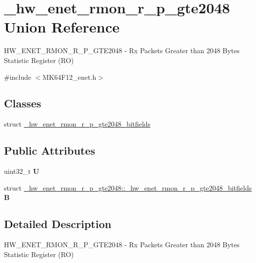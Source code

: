 \hypertarget{union__hw__enet__rmon__r__p__gte2048}{}\section{\+\_\+hw\+\_\+enet\+\_\+rmon\+\_\+r\+\_\+p\+\_\+gte2048 Union Reference}
\label{union__hw__enet__rmon__r__p__gte2048}


H\+W\+\_\+\+E\+N\+E\+T\+\_\+\+R\+M\+O\+N\+\_\+\+R\+\_\+\+P\+\_\+\+G\+T\+E2048 -\/ Rx Packets Greater than 2048 Bytes Statistic Register (RO)  




{\ttfamily \#include $<$M\+K64\+F12\+\_\+enet.\+h$>$}

\subsection*{Classes}
\begin{DoxyCompactItemize}
\item 
struct \hyperlink{struct__hw__enet__rmon__r__p__gte2048_1_1__hw__enet__rmon__r__p__gte2048__bitfields}{\+\_\+hw\+\_\+enet\+\_\+rmon\+\_\+r\+\_\+p\+\_\+gte2048\+\_\+bitfields}
\end{DoxyCompactItemize}
\subsection*{Public Attributes}
\begin{DoxyCompactItemize}
\item 
uint32\+\_\+t {\bfseries U}\hypertarget{union__hw__enet__rmon__r__p__gte2048_a294764e848a1016a521b30114d00d704}{}\label{union__hw__enet__rmon__r__p__gte2048_a294764e848a1016a521b30114d00d704}

\item 
struct \hyperlink{struct__hw__enet__rmon__r__p__gte2048_1_1__hw__enet__rmon__r__p__gte2048__bitfields}{\+\_\+hw\+\_\+enet\+\_\+rmon\+\_\+r\+\_\+p\+\_\+gte2048\+::\+\_\+hw\+\_\+enet\+\_\+rmon\+\_\+r\+\_\+p\+\_\+gte2048\+\_\+bitfields} {\bfseries B}\hypertarget{union__hw__enet__rmon__r__p__gte2048_af15a4dc94e6907a8ef9f08d005bd9a12}{}\label{union__hw__enet__rmon__r__p__gte2048_af15a4dc94e6907a8ef9f08d005bd9a12}

\end{DoxyCompactItemize}


\subsection{Detailed Description}
H\+W\+\_\+\+E\+N\+E\+T\+\_\+\+R\+M\+O\+N\+\_\+\+R\+\_\+\+P\+\_\+\+G\+T\+E2048 -\/ Rx Packets Greater than 2048 Bytes Statistic Register (RO) 

